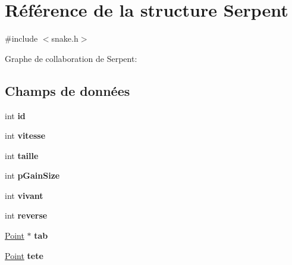 \hypertarget{struct_serpent}{}\section{Référence de la structure Serpent}
\label{struct_serpent}


{\ttfamily \#include $<$snake.\+h$>$}



Graphe de collaboration de Serpent\+:
\subsection*{Champs de données}
\begin{DoxyCompactItemize}
\item 
int {\bfseries id}\hypertarget{struct_serpent_a7441ef0865bcb3db9b8064dd7375c1ea}{}\label{struct_serpent_a7441ef0865bcb3db9b8064dd7375c1ea}

\item 
int {\bfseries vitesse}\hypertarget{struct_serpent_a4b512d0a6dcc3c7d7e6dd9a7714852c4}{}\label{struct_serpent_a4b512d0a6dcc3c7d7e6dd9a7714852c4}

\item 
int {\bfseries taille}\hypertarget{struct_serpent_a29bf3fc0ffe4e72e45f0c84ab4f8cd1e}{}\label{struct_serpent_a29bf3fc0ffe4e72e45f0c84ab4f8cd1e}

\item 
int {\bfseries p\+Gain\+Size}\hypertarget{struct_serpent_a548c901f9a4e3f1cd78d94e8b9c7f6d4}{}\label{struct_serpent_a548c901f9a4e3f1cd78d94e8b9c7f6d4}

\item 
int {\bfseries vivant}\hypertarget{struct_serpent_aedecaf717e967a68b10fc0623e8d74f8}{}\label{struct_serpent_aedecaf717e967a68b10fc0623e8d74f8}

\item 
int {\bfseries reverse}\hypertarget{struct_serpent_ae6ebe94aa9f2d314eb937d8a3042763f}{}\label{struct_serpent_ae6ebe94aa9f2d314eb937d8a3042763f}

\item 
\hyperlink{struct_point}{Point} $\ast$ {\bfseries tab}\hypertarget{struct_serpent_ad44190bd0d6846f34b2f440d8b028653}{}\label{struct_serpent_ad44190bd0d6846f34b2f440d8b028653}

\item 
\hyperlink{struct_point}{Point} {\bfseries tete}\hypertarget{struct_serpent_a7029c13111e60317aa11bbabd7a6dd66}{}\label{struct_serpent_a7029c13111e60317aa11bbabd7a6dd66}


\end{DoxyCompactItemize}
